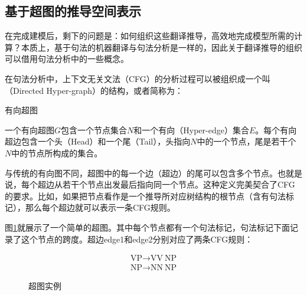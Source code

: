 
\subsection{基于超图的推导空间表示}

\parinterval 在完成建模后，剩下的问题是：如何组织这些翻译推导，高效地完成模型所需的计算？本质上，基于句法的机器翻译与句法分析是一样的，因此关于翻译推导的组织可以借用句法分析中的一些概念。

\parinterval 在句法分析中，上下文无关文法（CFG）的分析过程可以被组织成一个叫{\small{}}（Directed Hyper-graph）的结构，或者简称为{\small{}}：

\vspace{0.5em}
\begin{definition} 有向超图

{\small
一个有向超图$G$包含一个节点集合$N$和一个有向{\small{}}（Hyper-edge）集合$E$。每个有向超边包含一个头（Head）和一个尾（Tail），头指向$N$中的一个节点，尾是若干个$N$中的节点所构成的集合。
}
\end{definition}

\parinterval 与传统的有向图不同，超图中的每一个边（超边）的尾可以包含多个节点。也就是说，每个超边从若干个节点出发最后指向同一个节点。这种定义完美契合了CFG的要求。比如，如果把节点看作是一个推导所对应树结构的根节点（含有句法标记），那么每个超边就可以表示一条CFG规则。

\parinterval 图\ref{fig:8-37}就展示了一个简单的超图。其中每个节点都有一个句法标记，句法标记下面记录了这个节点的跨度。超边edge1和edge2分别对应了两条CFG规则：

\begin{eqnarray}
\textrm{VP} \rightarrow \textrm{VV}\ \textrm{NP} \nonumber \\
\textrm{NP} \rightarrow \textrm{NN}\ \textrm{NP} \nonumber
\end{eqnarray}
\vspace{-3.0em}
\begin{figure}[htp]
\centering

\setlength{\abovecaptionskip}{-0.1em}
\caption{超图实例}
\label{fig:8-37}
\end{figure}

